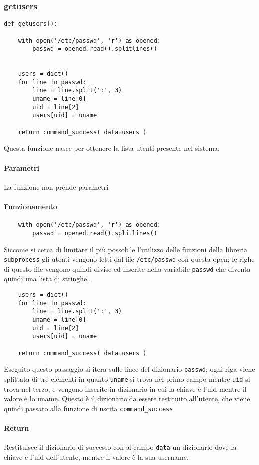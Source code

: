\documentclass[11pt]{article}
\begin{document}
\subsubsection{getusers}\label{getusers}
\begin{lstlisting}
def getusers():

    with open('/etc/passwd', 'r') as opened:
        passwd = opened.read().splitlines()


    users = dict()
    for line in passwd:
        line = line.split(':', 3)
        uname = line[0]
        uid = line[2]
        users[uid] = uname

    return command_success( data=users )
\end{lstlisting}
Questa funzione nasce per ottenere la lista utenti presente nel sistema.
\paragraph{Parametri}
La funzione non prende parametri
\paragraph{Funzionamento}
\begin{lstlisting}
    with open('/etc/passwd', 'r') as opened:
        passwd = opened.read().splitlines()
\end{lstlisting}
Siccome si cerca di limitare il più possobile l'utilizzo delle funzioni della libreria \texttt{subprocess} gli utenti vengono letti
dal file \texttt{/etc/passwd} con questa open; le righe di questo file vengono quindi divise ed inserite
nella variabile \texttt{passwd} che diventa quindi una lista di stringhe.
\begin{lstlisting}
    users = dict()
    for line in passwd:
        line = line.split(':', 3)
        uname = line[0]
        uid = line[2]
        users[uid] = uname

    return command_success( data=users )
\end{lstlisting}
Eseguito questo passaggio si itera sulle linee del dizionario \texttt{passwd}; ogni riga viene splittata di tre elementi in quanto
\texttt{uname} si trova nel primo campo mentre \texttt{uid} si trova nel terzo, e vengono inserite in dizionario in cui la chiave
è l'uid mentre il valore è lo uname. Questo è il dizionario da essere restituito all'utente, che viene quindi passato alla funzione
di uscita \texttt{command\_success}.
\paragraph{Return}
Restituisce il dizionario di successo con al campo \texttt{data} un dizionario dove la chiave è l'uid dell'utente, mentre il valore è
la sua username.
\end{document}
